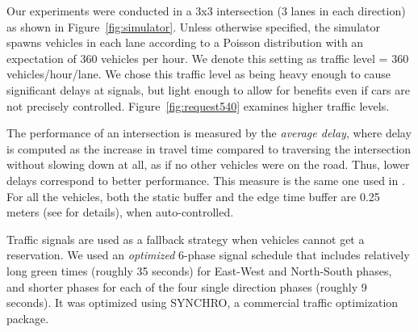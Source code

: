 Our experiments were conducted in a 3x3 intersection (3 lanes
in each direction) as shown in Figure~\ref{fig:simulator}.  Unless otherwise specified, the simulator spawns vehicles in each lane according
to a Poisson distribution with an expectation of 360 vehicles per
hour.  We denote this setting as traffic level = 360
vehicles/hour/lane.  We chose this traffic level as being heavy enough
to cause significant delays at signals, but light enough to allow for
benefits even if cars are not precisely
controlled. Figure~\ref{fig:request540} examines higher traffic
levels.


The performance of an intersection is measured by the \emph{average
delay}, where delay is computed as the increase in travel time
compared to traversing the intersection without slowing down at all,
as if no other vehicles were on the road. Thus, lower delays
correspond to better performance.  This measure is the same one used
in \cite{bib:Dresner08Multiagent}. For all the vehicles, both the
static buffer and the edge time buffer are 0.25 meters (see
\cite{bib:Dresner08Multiagent} for details), when auto-controlled.

Traffic signals are used as a fallback strategy when vehicles cannot
get a reservation.  We used an \emph{optimized} 6-phase signal
schedule that includes relatively long green times (roughly 35
seconds) for East-West and North-South phases, and shorter phases for
each of the four single direction phases (roughly 9 seconds). It was
optimized using SYNCHRO, a commercial traffic optimization package.



